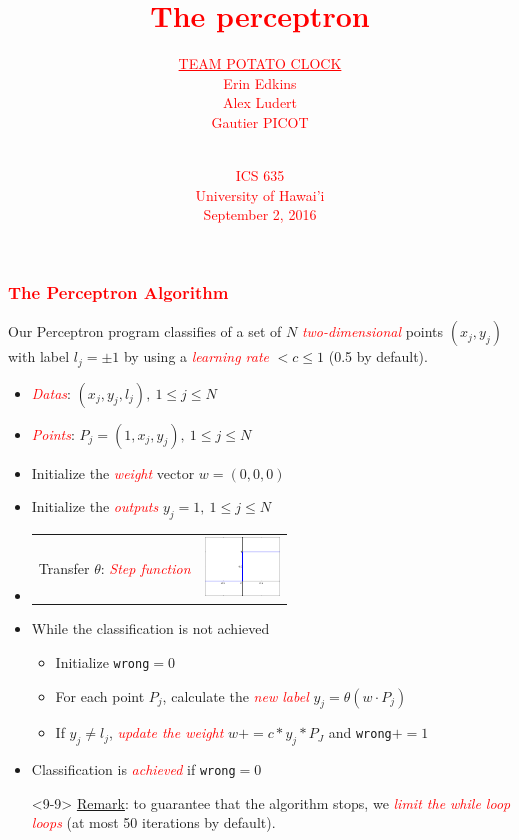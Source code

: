 \documentclass[9pt]{beamer}
\title{\textcolor{red}{The perceptron}}
\author{\textcolor{red}{\underline{TEAM POTATO CLOCK}\\ \vspace{0.1cm} Erin Edkins\\Alex Ludert\\Gautier PICOT\\}}
\date{ \\
\textcolor{red}{ICS 635\\University of Hawai'i\\ September 2, 2016}}
\theoremstyle{plain} \newtheorem{Theo}{Theorem}[section]
\theoremstyle{plain} \newtheorem{Prop}{Proposition}[section]
\theoremstyle{plain} \newtheorem{Def}{Definition}[section]
\theoremstyle{plain} \newtheorem{Lem}{Lemma}[section]
\begin{document}
{
\frame{\titlepage}
}	

\frame
{
\frametitle{\textcolor{red}{The Perceptron Algorithm}}
Our Perceptron program classifies of a set of $N$  \textit{\textcolor{red}{two-dimensional}} points $(x_j, y_j)$ with label $l_j=\pm 1$ by using a \textit{\textcolor{red}{learning rate}} $<c\leq 1$ (0.5 by default).

\begin{itemize}
\item<2-9>\textit{\textcolor{red}{Datas}}: $(x_j, y_j, l_j), \ 1\leq j \leq N $
\item<3-9>\textit{\textcolor{red}{Points}}: $P_j=(1,x_j, y_j), \ 1\leq j \leq N $
\item<4-9> Initialize the \textit{\textcolor{red}{weight}} vector $w=(0,0,0)$
\item<5-9> Initialize the \textit{\textcolor{red}{outputs}} $y_j=1,  \ 1\leq j \leq N $
\item<6-9>
\begin{tabular}{>{\centering\arraybackslash}m{} >{\centering\arraybackslash}m{}}
    Transfer $\theta$: \textit{\textcolor{red}{Step function}}  & \includegraphics[width=2cm]{step.png}\\
\end{tabular}
\item<7-9> While the classification is not achieved
\begin{itemize}
\item Initialize \texttt{wrong}$=0$
\item For each  point $P_j$, calculate the \textit{\textcolor{red}{new label}} $y_j=\theta(w\cdot P_j )$
		\item If $y_j \neq l_j$, \textit{\textcolor{red}{update the weight}} $w+= c*y_j*P_J$ and \texttt{wrong}$+=1$
\end{itemize}
\item <8-9> Classification is \textit{\textcolor{red}{achieved}} if \texttt{wrong}$=0$
\item []<9-9> \underline{Remark}: to guarantee that the algorithm stops, we  \textit{\textcolor{red}{limit the while loop loops}} (at most 50 iterations by default).
\end{itemize}
}
\frame
\end{document}
